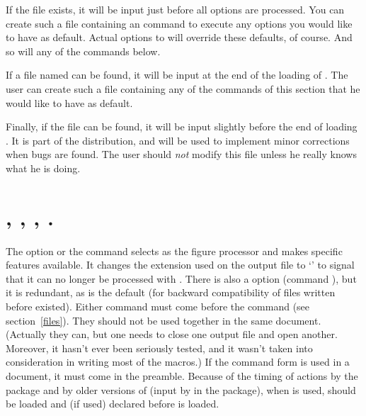 \documentclass[letterpaper]{article}
\begin{document}
If the file  exists, it will be input just before all
options are processed. You can create such a file containing an
 command to execute any options you would like to
have as default. Actual options to  will override these
defaults, of course. And so will any of the commands below.

If a file named  can be found, it will be input at the
end of the loading of \mfp{}. The user can create such a file containing
any of the commands of this section that he would like to have as
default.

Finally, if the file  can be found, it will be input
slightly before the end of loading \mfp{}. It is part of the \mfp{}
distribution, and will be used to implement minor corrections when bugs
are found. The user should \emph{not} modify this file unless
he really knows what he is doing.

\section{, , , .}%
\label{metapost}%

The option  or the command  selects \MP{}
as the figure processor and makes specific features available. It
changes the extension used on the output file to `' to signal
that it can no longer be processed with \MF{}. There is also a
 option (command ), but it is redundant,
as \MF{} is the default (for backward compatibility of files written
before \MP{} existed). Either command must come before the
 command (see section~\ref{files}). They should not
be used together in the same document. (Actually they can, but one needs
to close one output file and open another. Moreover, it hasn't ever been
seriously tested, and it wasn't taken into consideration in writing most
of the macros.) If the command form  is used in a
\LaTeXe{} document, it must come in the preamble. Because of the timing
of actions by the  package and by older versions of
 (input by  in the 
package), when \pdfLaTeX{} is used, \mfp{} should be loaded and
 (if used) declared before  is loaded.
\end{document}
